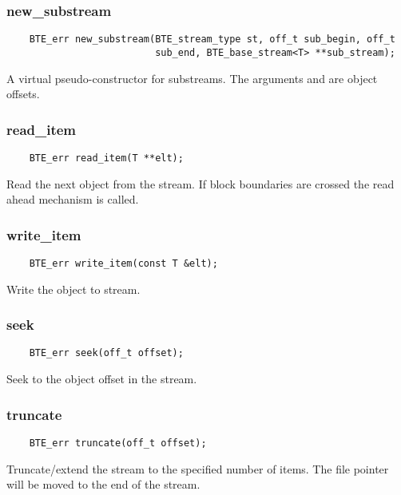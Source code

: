 \subsubsection{new\_substream}
\begin{verbatim}
    BTE_err new_substream(BTE_stream_type st, off_t sub_begin, off_t
                          sub_end, BTE_base_stream<T> **sub_stream);
\end{verbatim}
A virtual pseudo-constructor for substreams. The arguments  and
 are object offsets.


\subsubsection{read\_item}
\begin{verbatim}
    BTE_err read_item(T **elt);
\end{verbatim}
Read the next object from the stream. If block boundaries are crossed the
read ahead mechanism is called.

\subsubsection{write\_item}
\begin{verbatim}
    BTE_err write_item(const T &elt);
\end{verbatim}
Write the object to stream.


\subsubsection{seek}
\begin{verbatim}
    BTE_err seek(off_t offset);
\end{verbatim}
Seek to the object offset in the stream.


\subsubsection{truncate}
\begin{verbatim}
    BTE_err truncate(off_t offset);
\end{verbatim}
Truncate/extend the stream to the specified number of items. The file
pointer will be moved to the end of the stream.


